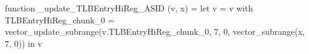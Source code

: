 function _update_TLBEntryHiReg_ASID (v, x) = let v = { v with TLBEntryHiReg_chunk_0 = vector_update_subrange(v.TLBEntryHiReg_chunk_0, 7, 0, vector_subrange(x, 7, 0)) } in v
